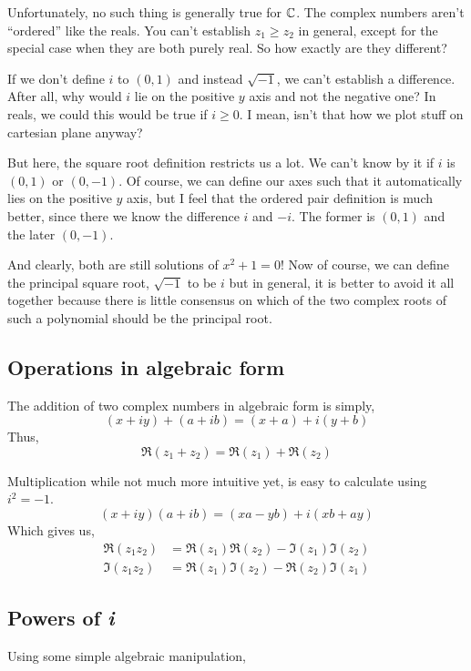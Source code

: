 Unfortunately, no such thing is generally true for \(\mathbb C\). The complex
numbers aren't ``ordered'' like the reals. You can't establish \(z_1 \ge z_2\) in general,
except for the special case when they are both purely real. So how exactly are they different?

If we don't define \(i\) to \((0,1)\) and instead \(\sqrt{-1}\), we can't
establish a difference. After all, why would \(i\) lie on the positive \(y\) axis
and not the negative one? In reals, we could this would be true if \(i \ge 0\). 
I mean, isn't that how we plot stuff on cartesian plane anyway? 

But here, the square root definition restricts us a lot. We can't know by it if
\(i\) is \((0,1)\) or \((0,-1)\). Of course, we can define our axes such that it
automatically lies on the positive \(y\) axis, but I feel that the ordered pair
definition is much better, since there we know the difference \(i\) and \(-i\). 
The former is \((0, 1)\) and the later \((0, -1)\). 

And clearly, both are still solutions of \(x^2 + 1 = 0\)! Now of course,
we can define the principal square root, \(\sqrt{-1}\) to be \(i\) but in general,
it is better to avoid it all together because there is little consensus on which of the
two complex roots of such a polynomial should be the principal root.

\subsection{Operations in algebraic form}

The addition of two complex numbers in algebraic form is simply,
\[(x + iy) + (a + ib) = (x+a) + i(y+b)\] Thus, 
\[\Re(z_1 + z_2) = \Re(z_1) + \Re(z_2)\]

Multiplication while not much more intuitive yet, is easy to calculate using \(i^2 = -1\).
\[(x+iy)(a+ib) = (xa - yb) + i(xb + ay)\] Which gives us,
\begin{align*}
    \Re(z_1z_2) &= \Re(z_1)\Re(z_2) - \Im(z_1)\Im(z_2) \\
    \Im(z_1z_2) &= \Re(z_1)\Im(z_2) - \Re(z_2)\Im(z_1)
\end{align*}

\subsection{Powers of \emph{i}}

Using some simple algebraic manipulation,

